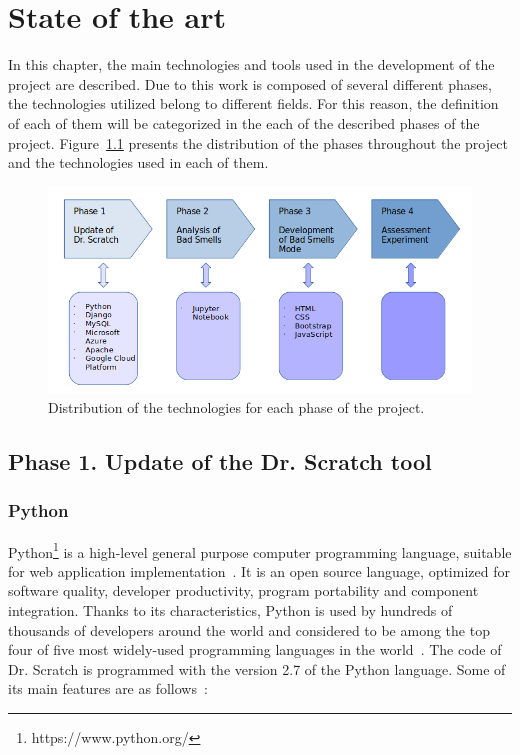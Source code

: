 

\chapter{State of the art}
\label{chap:state}

In this chapter, the main technologies and tools used in the development of the project are described. Due to this work is composed of several different phases, the technologies utilized belong to different fields. For this reason, the definition of each of them will be categorized in the each of the described phases of the project. Figure~\ref{fig:phasesdistribution} presents the distribution of the phases throughout the project and the technologies used in each of them. 

 \begin{figure}
    \centering
    \includegraphics[width=15cm,keepaspectratio]{img/phases_state_art.png}
    \caption{Distribution of the technologies for each phase of the project.}
    \label{fig:phasesdistribution}
\end{figure}

\section{Phase 1. Update of the Dr. Scratch tool}
\label{sec:phase_1}

\subsection{Python} 
\label{subsec:python}

Python\footnote{https://www.python.org/} is a high-level general purpose computer programming language, suitable for web application implementation~\cite{kuhlman:python}. It is an open source language, optimized for software quality, developer productivity, program portability and component integration. Thanks to its characteristics, Python is used by hundreds of thousands of developers around the world and considered to be among the top four of five most widely-used programming languages in the world~\cite{lutz:programming}. The code of Dr. Scratch is programmed with the version 2.7 of the Python language. Some of its main features are as follows~\cite{javatpoint:_python}:

